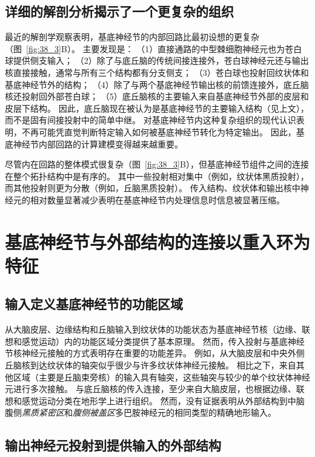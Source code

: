 \subsection{详细的解剖分析揭示了一个更复杂的组织}

最近的解剖学观察表明，基底神经节的内部回路比最初设想的更复杂（图~\ref{fig:38_3}B）。
主要发现是：
（1）直接通路的中型棘细胞神经元也为苍白球提供侧支输入； 
（2）除了与底丘脑的传统间接连接外，苍白球神经元还与输出核直接接触，通常与所有三个结构都有分支侧支；
（3）苍白球也投射回纹状体和基底神经节外的结构；
（4）除了与两个基底神经节输出核的前馈连接外，底丘脑核还投射回外部苍白球； 
（5）底丘脑核的主要输入来自基底神经节外部的皮层和皮层下结构。
因此，底丘脑现在被认为是基底神经节的主要输入结构（见上文），而不是固有间接投射中的简单中继。
对基底神经节内这种复杂组织的现代认识表明，不再可能凭直觉判断特定输入如何被基底神经节转化为特定输出。
因此，基底神经节内部回路的计算建模变得越来越重要。


尽管内在回路的整体模式很复杂（图~\ref{fig:38_3}B），但基底神经节组件之间的连接在整个拓扑结构中是有序的。
其中一些投射相对集中（例如，纹状体黑质投射），而其他投射则更为分散（例如，丘脑黑质投射）。
传入结构、纹状体和输出核中神经元的相对数量显著减少表明在基底神经节内处理信息时信息被显著压缩。



\section{基底神经节与外部结构的连接以重入环为特征}

\subsection{输入定义基底神经节的功能区域}

从大脑皮层、边缘结构和丘脑输入到纹状体的功能状态为基底神经节核（边缘、联想和感觉运动）内的功能区域分类提供了基本原理。
然而，传入投射与基底神经节核神经元接触的方式表明存在重要的功能差异。
例如，从大脑皮层和中央外侧丘脑核到达纹状体的轴突似乎很少与许多纹状体神经元接触。
相比之下，来自其他区域（主要是丘脑束旁核）的输入具有轴突，这些轴突与较少的单个纹状体神经元进行多次接触。
与底丘脑核的传入连接，至少来自大脑皮层，也根据边缘、联想和感觉运动分类在地形学上进行组织。
然而，没有证据表明从外部结构到中脑腹侧\textit{黑质紧密区}和\textit{腹侧被盖区}多巴胺神经元的相同类型的精确地形输入。



\subsection{输出神经元投射到提供输入的外部结构}

